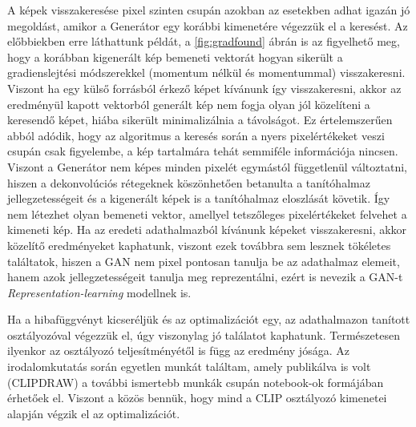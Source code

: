 \newpage


A képek visszakeresése pixel szinten csupán azokban az esetekben adhat igazán jó megoldást, amikor a Generátor egy korábbi kimenetére végezzük el a keresést. Az előbbiekben erre láthattunk példát, a \ref{fig:gradfound} ábrán is az figyelhető meg, hogy a korábban kigenerált kép bemeneti vektorát hogyan sikerült a gradienslejtési módszerekkel (momentum nélkül és momentummal) visszakeresni.
Viszont ha egy külső forrásból érkező képet kívánunk így visszakeresni, akkor az eredményül kapott vektorból generált kép nem fogja olyan jól közelíteni a keresendő képet, hiába sikerült minimalizálnia a távolságot.
Ez értelemszerűen abból adódik, hogy az algoritmus a keresés során a nyers pixelértékeket veszi csupán csak figyelembe, a kép tartalmára tehát semmiféle információja nincsen. Viszont a Generátor nem képes minden pixelét egymástól függetlenül változtatni, hiszen a dekonvolúciós rétegeknek köszönhetően betanulta a tanítóhalmaz jellegzetességeit és a kigenerált képek is a tanítóhalmaz eloszlását követik. Így nem létezhet olyan bemeneti vektor, amellyel tetszőleges pixelértékeket felvehet a kimeneti kép.
Ha az eredeti adathalmazból  kívánunk képeket visszakeresni, akkor közelítő eredményeket kaphatunk, viszont ezek továbbra sem lesznek tökéletes találtatok, hiszen a GAN nem pixel pontosan tanulja be az adathalmaz elemeit, hanem azok jellegzetességeit tanulja meg reprezentálni, ezért is nevezik a GAN-t \textit{Representation-learning} \cite{geron2019hands} modellnek is.

Ha a hibafüggvényt kicseréljük és az optimalizációt egy, az adathalmazon tanított osztályozóval végezzük el, úgy viszonylag jó találatot kaphatunk. Természetesen ilyenkor az osztályozó teljesítményétől is függ az eredmény jósága.
Az irodalomkutatás során egyetlen munkát találtam, amely publikálva is volt (CLIPDRAW\cite{frans2021clipdraw}) a további ismertebb munkák csupán notebook-ok formájában érhetőek el. Viszont a közös bennük, hogy mind a CLIP\cite{radford2021learning} osztályozó kimenetei alapján végzik el az optimalizációt.

